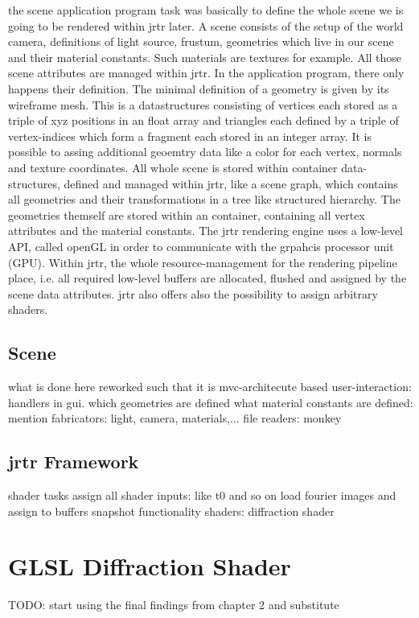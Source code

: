 the scene application program task was basically to define the whole scene we is going to be rendered within jrtr later.
A scene consists of the setup of the world camera, definitions of light source, frustum, geometries which live in our scene and their material constants. Such materials are textures for example. All those scene attributes are managed within jrtr. In the application program, there only happens their definition.
The minimal definition of a geometry is given by its wireframe mesh. This is a datastructures consisting of vertices each stored as a triple of xyz positions in an float array and triangles each defined by a triple of vertex-indices which form a fragment each stored in an integer array. It is possible to assing additional geoemtry data like a color for each vertex, normals and texture coordinates.
All whole scene is stored within container data-structures, defined and managed within jrtr, like a scene graph, which contains all geometries and their transformations in a tree like structured hierarchy. The geometries themself are stored within an container, containing all vertex attributes and the material constants.
The jrtr rendering engine uses a low-level API, called openGL in order to communicate with the grpahcis processor unit (GPU). Within jrtr, the whole resource-management for the rendering pipeline place, i.e. all required low-level buffers are allocated, flushed and assigned by the scene data attributes. jrtr also offers also the possibility to assign arbitrary shaders.
   
\subsection{Scene}
what is done here 
reworked such that it is mvc-architecute based
user-interaction: handlers in gui.
which geometries are defined
what material constants are defined: mention fabricators: light, camera, materials,...
file readers: monkey

\subsection{jrtr Framework}
shader tasks
assign all shader inputs: like t0 and so on
load fourier images and assign to buffers
snapshot functionality
shaders: diffraction shader


\section{GLSL Diffraction Shader}
TODO: start using the final findings from chapter 2 and substitute


